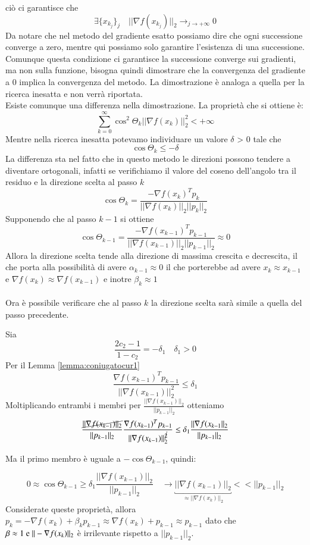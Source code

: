 ciò ci garantisce che
$$ \exists \{ x_{k_{j}} \}_{j} \quad || \nabla f(x_{k_{j}}) ||_{2} \longrightarrow_{j \to + \infty} 0$$
Da notare che nel metodo del gradiente esatto possiamo dire che ogni
successione converge a zero, mentre qui possiamo solo garantire
l'esistenza di una successione. Comunque questa condizione ci
garantisce la successione converge sui gradienti, ma non sulla
funzione, bisogna quindi dimostrare che la convergenza del gradiente a
0 implica la convergenza del metodo. La dimostrazione \`e analoga a
quella per la ricerca inesatta e non verrà riportata. \\ Esiste
comunque una differenza nella dimostrazione. La proprietà che si
ottiene \`e:
$$  \displaystyle \sum_{k=0}^{\infty} \cos^{2} \Theta_{k} || \nabla f(x_{k})||_{2}^{2} < +\infty $$
Mentre nella ricerca inesatta potevamo individuare un valore $\delta$
> 0 tale che
$$ \cos \Theta_{k} \leq  -\delta$$
La differenza sta nel fatto che in questo metodo le direzioni possono
tendere a diventare ortogonali, infatti se verifichiamo il valore del
coseno dell'angolo tra il residuo e la direzione scelta al passo $k$
$$ \cos \Theta_{k} = \frac{-\nabla f(x_{k})^{T} p_{k}}
      {|| \nabla f(x_{k})||_{2} ||p_{k}||_{2}}$$ Supponendo che al
passo $k-1$ si ottiene
$$ \cos \Theta_{k-1} = \frac{-\nabla f(x_{k-1})^{T} p_{k-1}}
      {|| \nabla f(x_{k-1})||_{2} ||p_{k-1}||_{2}} \approx 0$$ Allora
la direzione scelta tende alla direzione di massima crescita e
decrescita, il che porta alla possibilità di avere $\alpha_{k-1}
\approx 0$ il che porterebbe ad avere $x_{k} \approx x_{k-1}$ e
$\nabla f(x_{k}) \approx \nabla f(x_{k-1})$ e inotre $ \beta_{k}
\approx 1$\\ \\ Ora \`e possibile verificare che al passo $k$ la
direzione scelta sarà simile a quella del passo precedente.

Sia $$ \frac{2 c_2 -1}{1-c_2}= - \delta_{1} \quad \delta_{1} > 0 $$
Per il Lemma \ref{lemma:coniugatocur1}
$$\frac{\nabla f(x_{k-1})^{T}p_{k-1}}{|| \nabla f(x_{k-1})||_{2}^{2}} \leq \delta_{1}$$
Moltiplicando entrambi i membri per $\frac{||\nabla
f(x_{k-1})||_{2}}{|| p_{k-1}||_{2}}$ otteniamo
$$
\frac{\cancel{||\nabla f(x_{k-1})||_{2}}}{|| p_{k-1}||_{2}}
\frac{\nabla f(x_{k-1})^{T}p_{k-1}}{|| \nabla
f(x_{k-1})||_{2}^{\cancel{2}}} \leq \delta_{1} \frac{||\nabla
f(x_{k-1}||_{2}}{|| p_{k-1}||_{2}}
$$

Ma il primo membro \`e uguale a $-\cos \Theta_{k-1} $, quindi:

$$ 0 \approx \cos \Theta_{k-1} \geq 
\delta_{1} \frac{||\nabla f(x_{k-1})||_{2}}{|| p_{k-1}||_{2}} \quad
\rightarrow \underbracket{|| \nabla f(x_{k-1})||_{2}}_{\approx ||
\nabla f(x_{k})||_{2}} << ||p_{k-1} ||_{2}
$$
Considerate queste proprietà, allora $ p_{k} = -\nabla f(x_{k}) +
\beta_{k} p_{k-1} \approx \nabla f(x_{k}) + p_{k-1} \approx p_{k-1}$
dato che $\beta \approx 1 \text{ e }\\ || -\nabla f(x_{k})||_{2} $ \`e
irrilevante rispetto a $||p_{k-1}||_{2}$.

